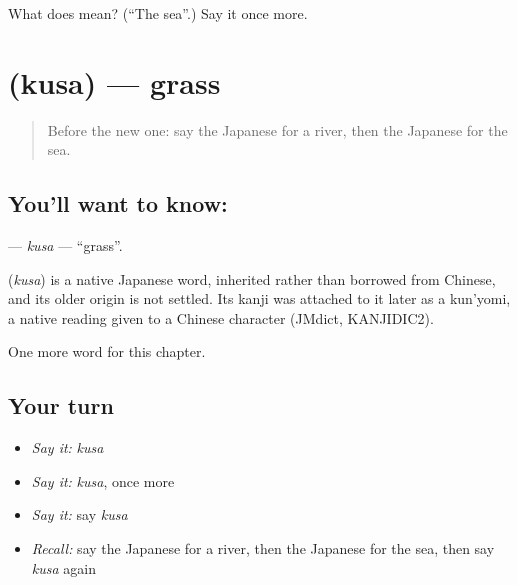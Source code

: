 \begin{tcolorbox}[breakable,colback=teal!4,colframe=teal!35!black,title={Before you move on}]
What does  mean? (\textquotedblleft{}The sea\textquotedblright{}.) Say it once more.
\end{tcolorbox}
\section[\texorpdfstring{\ja{くさ} (kusa)}{くさ (kusa)}]{ (kusa) — grass}

\label{lesson:JA-C42-kusa}



\begin{quote}
Before the new one: say the Japanese for a river, then the Japanese for the sea.
\end{quote}

\subsection*{You'll want to know: }
\textbf{} — \emph{kusa} — \textquotedblleft{}grass\textquotedblright{}.

\begin{cousinweb}
\textbf{} (\emph{kusa}) is a native Japanese word, inherited rather than borrowed from Chinese, and its older origin is not settled. Its kanji was attached to it later as a kun'yomi, a native reading given to a Chinese character (JMdict, KANJIDIC2).
\end{cousinweb}

\begin{grammarlens}[title={What you've built}]
One more word for this chapter.
\end{grammarlens}

\subsection*{Your turn}
\begin{itemize}
\raggedright
  \item \emph{Say it:} \emph{kusa}
  \item \emph{Say it:} \emph{kusa}, once more
  \item \emph{Say it:} say \emph{kusa}
  \item \emph{Recall:} say the Japanese for a river, then the Japanese for the sea, then say \emph{kusa} again
\end{itemize}

